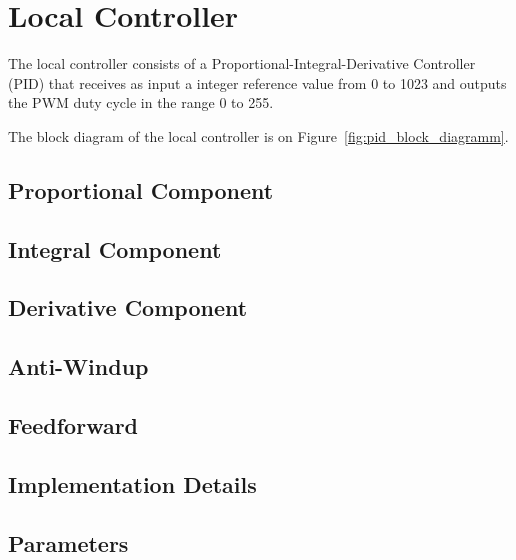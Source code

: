 

\section{Local Controller}
\label{sec:LocalController}

The local controller consists of a Proportional-Integral-Derivative Controller (PID) that receives as input a integer reference value from 0 to 1023 and outputs the PWM duty cycle in the range 0 to 255.

The block diagram of the local controller is on Figure~\ref{fig:pid_block_diagramm}.  

\subsection{Proportional Component}
\label{sub:ProportionalComponent}

\subsection{Integral Component}
\label{sub:IntegralComponent}

\subsection{Derivative Component}
\label{sub:Derivative Component}

\subsection{Anti-Windup}
\label{sub:AntiWindup}

\subsection{Feedforward}
\label{sub:Feedforward}

\subsection{Implementation Details}
\label{sub:Implementation Details}

\subsection{Parameters}
\label{sub:Parameters}
